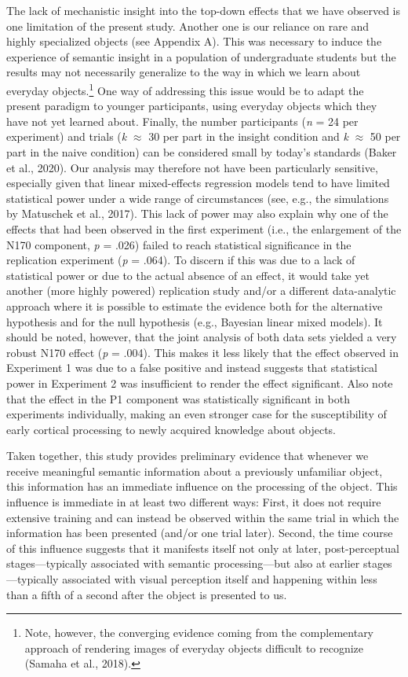 \documentclass[
  english,
  doc,12pt,twoside,floatsintext]{apa7}
\begin{document}
The lack of mechanistic insight into the top-down effects that we have observed is one limitation of the present study. Another one is our reliance on rare and highly specialized objects (see Appendix A). This was necessary to induce the experience of semantic insight in a population of undergraduate students but the results may not necessarily generalize to the way in which we learn about everyday objects.\footnote{Note, however, the converging evidence coming from the complementary approach of rendering images of everyday objects difficult to recognize (Samaha et al., 2018).} One way of addressing this issue would be to adapt the present paradigm to younger participants, using everyday objects which they have not yet learned about. Finally, the number participants (\emph{n} = 24 per experiment) and trials (\emph{k} \(\approx\) 30 per part in the insight condition and \emph{k} \(\approx\) 50 per part in the naive condition) can be considered small by today's standards (Baker et al., 2020). Our analysis may therefore not have been particularly sensitive, especially given that linear mixed-effects regression models tend to have limited statistical power under a wide range of circumstances (see, e.g., the simulations by Matuschek et al., 2017). This lack of power may also explain why one of the effects that had been observed in the first experiment (i.e., the enlargement of the N170 component, \emph{p} = .026) failed to reach statistical significance in the replication experiment (\emph{p} = .064). To discern if this was due to a lack of statistical power or due to the actual absence of an effect, it would take yet another (more highly powered) replication study and/or a different data-analytic approach where it is possible to estimate the evidence both for the alternative hypothesis and for the null hypothesis (e.g., Bayesian linear mixed models). It should be noted, however, that the joint analysis of both data sets yielded a very robust N170 effect (\emph{p} = .004). This makes it less likely that the effect observed in Experiment 1 was due to a false positive and instead suggests that statistical power in Experiment 2 was insufficient to render the effect significant. Also note that the effect in the P1 component was statistically significant in both experiments individually, making an even stronger case for the susceptibility of early cortical processing to newly acquired knowledge about objects.

Taken together, this study provides preliminary evidence that whenever we receive meaningful semantic information about a previously unfamiliar object, this information has an immediate influence on the processing of the object. This influence is immediate in at least two different ways: First, it does not require extensive training and can instead be observed within the same trial in which the information has been presented (and/or one trial later). Second, the time course of this influence suggests that it manifests itself not only at later, post-perceptual stages---typically associated with semantic processing---but also at earlier stages---typically associated with visual perception itself and happening within less than a fifth of a second after the object is presented to us.
\end{document}
